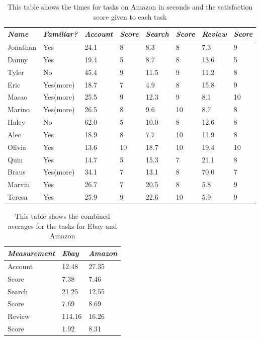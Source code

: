 \documentclass{article}
\begin{document}
\begin{table}
\centering
\begin{tabular}{|l|l|l|l|l|l|l|l|}
  \hline
  \emph {Name} & \emph{Familiar?} & \emph{Account} & \emph{Score} & \emph{Search} & \emph{Score} & \emph{Review} & \emph{Score}\\
  \hline
  Jonathan & Yes & 24.1 & 8 & 8.3 & 8 & 7.3 & 9\\
  \hline
  Danny & Yes & 19.4 & 5 & 8.7 & 8 & 13.6 & 5\\
  \hline
  Tyler & No & 45.4 & 9 & 11.5 & 9 & 11.2 & 8\\
  \hline
  Eric & Yes(more) & 18.7 & 7 & 4.9 & 8 & 15.8 & 9\\
  \hline
  Masao & Yes(more) & 25.5 & 9 & 12.3 & 9 & 8.1 & 10\\
  \hline
  Marino & Yes(more) & 26.5 & 8 & 9.6 & 10 & 8.7 & 8\\
  \hline
  Haley & No & 62.0 & 5 & 10.0 & 8 & 12.6 & 8\\
  \hline
  Alec & Yes & 18.9 & 8 & 7.7 & 10 & 11.9 & 8\\
  \hline
  Olivia & Yes & 13.6 & 10 & 18.7 & 10 & 19.4 & 10\\
  \hline
  Quin & Yes & 14.7 & 5 & 15.3 & 7 & 21.1 & 8\\
  \hline
  Braus & Yes(more) & 34.1 & 7 & 13.1 & 8 & 70.0 & 7\\
  \hline
  Marvin & Yes & 26.7 & 7 & 20.5 & 8 & 5.8 & 9\\
  \hline
  Teresa & Yes & 25.9 & 9 & 22.6 & 10 & 5.9 & 9\\
  \hline
\end{tabular}
\caption{This table shows the times for tasks on Amazon in seconds and the satisfaction score given to each task}
\end{table}

\begin{table}
\centering
\begin{tabular}{|l||l|l|}
  \hline
  \emph {Measurement} & \emph{Ebay} & \emph{Amazon}\\
  \hline
  Account & 12.48 & 27.35\\
  \hline
  Score & 7.38 & 7.46\\
  \hline
  Search & 21.25 & 12.55\\
  \hline
  Score & 7.69 & 8.69\\
  \hline
  Review & 114.16 & 16.26\\
  \hline
  Score & 1.92 & 8.31\\
  \hline
\end{tabular}
\caption{This table shows the combined averages for the tasks for Ebay and Amazon}
\end{table}
\end{document}
